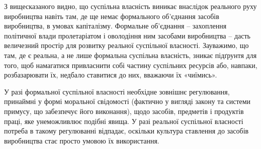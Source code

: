 \documentclass[../main]{subfiles}
\begin{document}
З вищесказаного видно, що суспільна власність виникає внаслідок реального руху виробництва навіть там, де ще немає формального об’єднання засобів виробництва, в умовах капіталізму. Формальне об’єднання – захоплення політичної влади пролетаріатом і оволодіння ним засобами виробництва – дасть величезний простір для розвитку реальної суспільної власності. Зауважимо, що там, де є реальна, а не лише формальна суспільна власність, зникає підґрунтя для того, щоб намагатися привласнити собі частину суспільних ресурсів або, навпаки, розбазарювати їх, недбало ставитися до них, вважаючи їх «чиїмись».

У разі формальної суспільної власності необхідне зовнішнє регулювання, принаймні у формі моральної свідомості (фактично у вигляді закону та системи примусу, що забезпечує його виконання), щодо засобів, предметів і продуктів праці, яке унеможливлює подібні явища. У разі реальної суспільної власності потреба в такому регулюванні відпадає, оскільки культура ставлення до засобів виробництва стає просто умовою їх використання.
\end{document}
